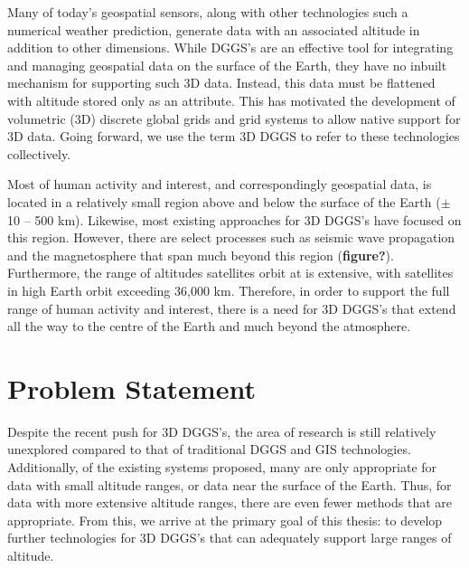 
Many of today's geospatial sensors, along with other technologies such a numerical weather prediction, generate data with an associated altitude in addition to other dimensions.
While DGGS's are an effective tool for integrating and managing geospatial data on the surface of the Earth, they have no inbuilt mechanism for supporting such 3D data.
Instead, this data must be flattened with altitude stored only as an attribute.
This has motivated the development of volumetric (3D) discrete global grids and grid systems to allow native support for 3D data.
Going forward, we use the term 3D DGGS to refer to these technologies collectively.


Most of human activity and interest, and correspondingly geospatial data, is located in a relatively small region above and below the surface of the Earth ($\pm$10 -- 500 km).
Likewise, most existing approaches for 3D DGGS's have focused on this region.
However, there are select processes such as seismic wave propagation and the magnetosphere that span much beyond this region (\textbf{figure?}).
Furthermore, the range of altitudes satellites orbit at is extensive, with satellites in high Earth orbit exceeding 36,000 km.
Therefore, in order to support the full range of human activity and interest, there is a need for 3D DGGS's that extend all the way to the centre of the Earth and much beyond the atmosphere.


\section{Problem Statement}
Despite the recent push for 3D DGGS's, the area of research is still relatively unexplored compared to that of traditional DGGS and GIS technologies.
Additionally, of the existing systems proposed, many are only appropriate for data with small altitude ranges, or data near the surface of the Earth.
Thus, for data with more extensive altitude ranges, there are even fewer methods that are appropriate. 
From this, we arrive at the primary goal of this thesis: to develop further technologies for 3D DGGS's that can adequately support large ranges of altitude. 


